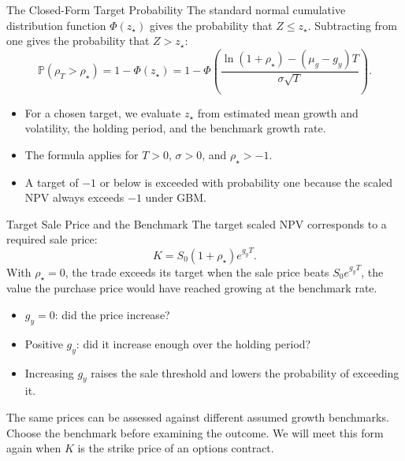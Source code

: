 \documentclass[aspectratio=169,11pt]{beamer}
\newcommand{\Pmeasure}{\mathbb{P}}
\newcommand{\mug}{\mu_g}
\begin{document}
\begin{frame}{The Closed-Form Target Probability}
  The standard normal cumulative distribution function $\Phi(z_\star)$ gives
  the probability that $Z\le z_\star$. Subtracting from one gives the
  probability that $Z>z_\star$:
  \[
    \boxed{\Pmeasure(\rho_T>\rho_\star)
      =1-\Phi(z_\star)
      =1-\Phi\!\left(
        \frac{\ln(1+\rho_\star)-(\mug-g_y)T}{\sigma\sqrt T}\right).}
  \]

  \vspace{0.4em}
  \begin{itemize}\setlength{\itemsep}{0.5em}
    \item For a chosen target, we evaluate $z_\star$ from estimated mean growth
      and volatility, the holding period, and the benchmark growth rate.
    \item The formula applies for $T>0$, $\sigma>0$, and $\rho_\star>-1$.
    \item A target of $-1$ or below is exceeded with probability one because
      the scaled NPV always exceeds $-1$ under GBM.
  \end{itemize}
\end{frame}

\begin{frame}{Target Sale Price and the Benchmark}
The target scaled NPV corresponds to a required sale price:
\[
K=S_0(1+\rho_\star)e^{g_yT}.
\]
With $\rho_\star=0$, the trade exceeds its target when the sale price beats
$S_0e^{g_yT}$, the value the purchase price would have reached growing at the
benchmark rate.

\vspace{0.6em}
\begin{itemize}\setlength{\itemsep}{0.55em}
\item $g_y=0$: did the price increase?
\item Positive $g_y$: did it increase enough over the holding period?
\item Increasing $g_y$ raises the sale threshold and lowers the probability of exceeding it.
\end{itemize}
\vspace{0.5em}
The same prices can be assessed against different assumed growth benchmarks.
Choose the benchmark before examining the outcome. We will meet this form
again when $K$ is the strike price of an options contract.
\end{frame}
\end{document}
